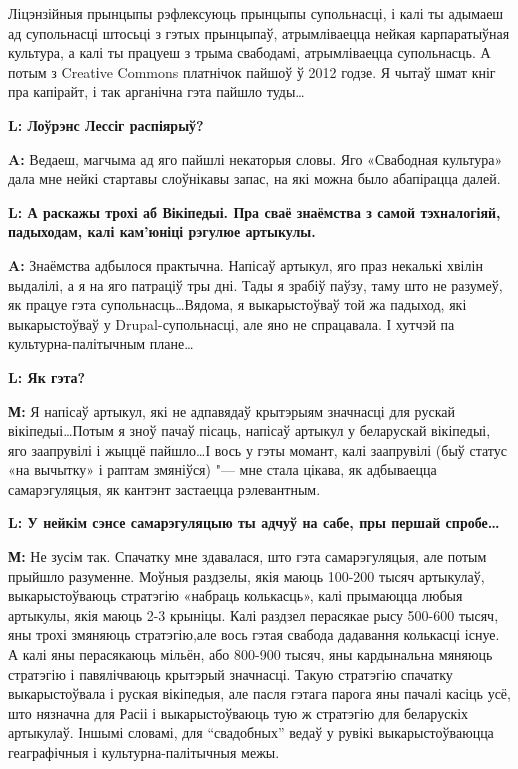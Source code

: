 \documentclass[10pt, a5paper]{article}
\begin{document}
Ліцэнзійныя прынцыпы рэфлексуюць прынцыпы супольнасці, і калі ты адымаеш ад супольнасці штосьці з гэтых прынцыпаў, атрымліваецца нейкая карпаратыўная культура, а калі ты працуеш з трыма свабодамі, атрымліваецца супольнасць. А потым з Creatіve Commons платнічок пайшоў ў 2012 годзе. Я чытаў шмат кніг пра капірайт, і так арганічна гэта пайшло туды\ldots
 

{\noindent \bf L: Лоўрэнс Лессіг распіярыў?}

{\noindent \bf A:} Ведаеш, магчыма ад яго пайшлі некаторыя словы. Яго «Свабодная культура» дала мне нейкі стартавы слоўнікавы запас, на які можна было абапірацца далей.

{\noindent \bf L: А раскажы трохі аб Вікіпедыі. Пра сваё знаёмства з самой тэхналогіяй, падыходам, калі кам'юніці рэгулюе артыкулы.}

{\noindent \bf A:} Знаёмства адбылося практычна. Напісаў артыкул, яго праз не\-калькі хвілін выдалілі, а я на яго патраціў тры дні. Тады я зрабіў паўзу, таму што не разумеў, як працуе гэта супольнасць\ldots Вядома, я выкарыстоўваў той жа падыход, які выкарыстоўваў у Drupal-супольнасці, але яно не спрацавала. І хутчэй па культурна-палі\-тычным плане\ldots

{\noindent \bf L: Як гэта?}

{\noindent \bf М:} Я напісаў артыкул, які не адпавядаў крытэрыям значнасці для рускай вікіпедыі\ldots Потым я зноў пачаў пісаць, напісаў артыкул у беларускай вікіпедыі, яго заапрувілі і жыццё пайшло\ldots І вось у гэты момант, калі заапрувілі (быў статус «на вычытку» і раптам змяніўся) "--- мне стала цікава, як адбываецца самарэгуляцыя, як кантэнт застаецца рэлевантным.

{\noindent \bf L: У нейкім сэнсе самарэгуляцыю ты адчуў на сабе, пры першай спробе\ldots}

{\noindent \bf М:} Не зусім так. Спачатку мне здавалася, што гэта самарэгуляцыя, але потым прыйшло разуменне. Моўныя раздзелы, якія маюць 100-200 тысяч артыкулаў, выкарыстоўваюць стратэгію «набраць колькасць», калі прымаюцца любыя артыкулы, якія маюць 2-3 крыніцы. Калі раздзел перасякае рысу 500-600 тысяч, яны трохі змяняюць стратэгію,але вось гэтая свабода дадавання колькасці існуе. А калі яны перасякаюць мільён, або 800-900 тысяч, яны кардынальна мяняюць стратэгію і павялічваюць крытэрый значнасці. Такую стратэгію спачатку выкарыстоўвала і руская вікіпедыя, але пасля гэтага парога яны пачалі касіць усё, што нязначна для Расіі і выкарыстоўваюць тую ж стратэгію для беларускіх артыкулаў. Іншымі словамі, для “свадобных” ведаў у рувікі выкарыстоўваюцца геаграфічныя і культурна-палітычныя межы.
\end{document}
